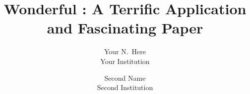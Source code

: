 \documentclass[letterpaper,twocolumn,10pt]{article}
\begin{document}


\date{}

\title{\Large \bf Wonderful : A Terrific Application and Fascinating Paper}

\author{
	{\rm Your N.\ Here}\\
	Your Institution
	\and
	{\rm Second Name}\\
	Second Institution
} %

\maketitle

\thispagestyle{empty}



{\normalsize 
}


\end{document}
